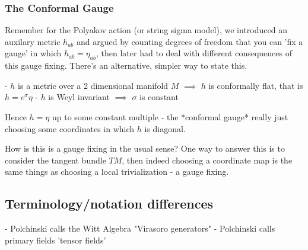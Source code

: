 \subsubsection{ The Conformal Gauge}
Remember for the Polyakov action (or string sigma model), we introduced an auxilary metric $h_{ab}$ and argued by counting degrees of freedom that you can 'fix a gauge' in which $h_{ab} = \eta_{ab} $, then later had to deal with different consequences of this gauge fixing. There's an alternative, simpler way to state this.

- $h$ is a metric over a 2 dimensional manifold $M$
$\implies$ $h$ is conformally flat, that is $h = e^\sigma \eta$
- $h$ is Weyl invariant
$\implies$ $\sigma$ is constant

Hence $h = \eta$ up to some constant multiple - the *conformal gauge*  really just choosing some coordinates in which $h$ is diagonal. 

How is this is a gauge fixing in the usual sense? One way to answer this is to consider the tangent bundle $TM$, then indeed choosing a coordinate map is the same things as choosing a local trivialization - a gauge fixing.

\subsection{ Terminology/notation differences}

- Polchinski calls the Witt Algebra "Virasoro generators"
- Polchinski calls primary fields 'tensor fields'